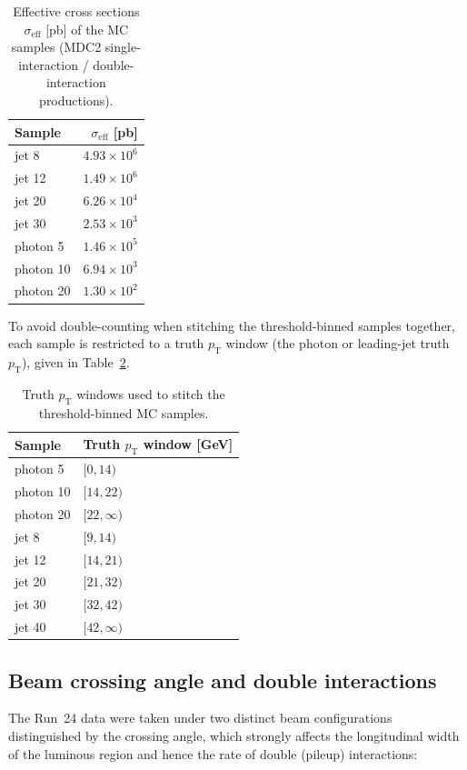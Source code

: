 \documentclass[11pt]{article}
\newcommand{\pt}{p_{\mathrm{T}}}
\begin{document}
\begin{table}[h]
\centering
\caption{Effective cross sections $\sigma_{\mathrm{eff}}$ [pb] of the MC samples
(MDC2 single-interaction / double-interaction productions).}
\label{tab:sigeff}
\begin{tabular}{lr}
\toprule
Sample & $\sigma_{\mathrm{eff}}$ [pb] \\
\midrule
jet 8  & $4.93\times10^{6}$ \\
jet 12 & $1.49\times10^{6}$ \\
jet 20 & $6.26\times10^{4}$ \\
jet 30 & $2.53\times10^{3}$ \\
photon 5  & $1.46\times10^{5}$ \\
photon 10 & $6.94\times10^{3}$ \\
photon 20 & $1.30\times10^{2}$ \\
\bottomrule
\end{tabular}
\end{table}

To avoid double-counting when stitching the threshold-binned samples together,
each sample is restricted to a truth $\pt$ window (the photon or leading-jet
truth $\pt$), given in Table~\ref{tab:ptwin}.

\begin{table}[h]
\centering
\caption{Truth $\pt$ windows used to stitch the threshold-binned MC samples.}
\label{tab:ptwin}
\begin{tabular}{ll}
\toprule
Sample & Truth $\pt$ window [GeV] \\
\midrule
photon 5  & $[0,14)$ \\
photon 10 & $[14,22)$ \\
photon 20 & $[22,\infty)$ \\
jet 8  & $[9,14)$ \\
jet 12 & $[14,21)$ \\
jet 20 & $[21,32)$ \\
jet 30 & $[32,42)$ \\
jet 40 & $[42,\infty)$ \\
\bottomrule
\end{tabular}
\end{table}

\subsection{Beam crossing angle and double interactions}

The Run~24 data were taken under two distinct beam configurations distinguished
by the crossing angle, which strongly affects the longitudinal width of the
luminous region and hence the rate of double (pileup) interactions:
\end{document}
